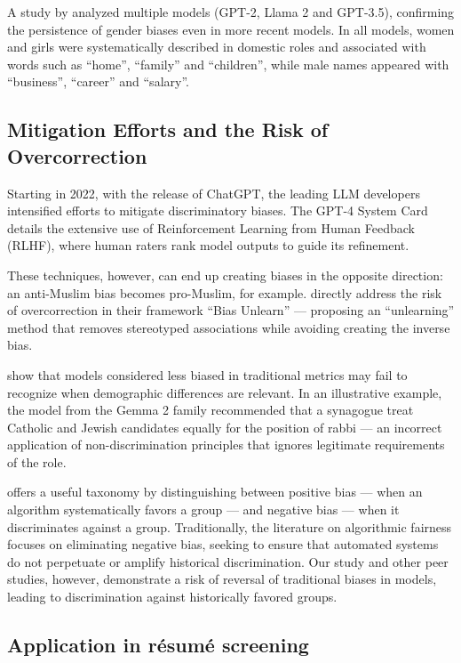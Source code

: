 \documentclass[12pt,a4paper]{article}
\begin{document}
A study by \citet{unesco2024} analyzed multiple models (GPT-2, Llama 2 and
GPT-3.5), confirming the persistence of gender biases even in
more recent models. In all models, women and girls were
systematically described in domestic roles and associated with words
such as ``home'', ``family'' and ``children'', while male names
appeared with ``business'', ``career'' and ``salary''.


\subsection{Mitigation Efforts and the Risk of Overcorrection}


Starting in 2022, with the release of ChatGPT, the leading
LLM developers intensified efforts to mitigate discriminatory
biases. The GPT-4 System Card \citep{openai2023} details the
extensive use of Reinforcement Learning from Human Feedback (RLHF), where
human raters rank model outputs to guide its
refinement.

These techniques, however, can end up creating biases in the opposite direction: an
anti-Muslim bias becomes pro-Muslim, for example. \citet{liu2025} directly address the risk of overcorrection in their framework
``Bias Unlearn'' --- proposing an ``unlearning'' method that removes
stereotyped associations while avoiding creating the inverse bias.

\citet{wang2024} show that models considered less biased
in traditional metrics may fail to recognize when demographic differences
are relevant. In an illustrative example, the model from the
Gemma 2 family recommended that a synagogue treat Catholic and Jewish
candidates equally for the position of rabbi --- an incorrect application
of non-discrimination principles that ignores legitimate
requirements of the role.

\citet{ferrara2024} offers a useful taxonomy by distinguishing between positive
bias --- when an algorithm systematically favors a group ---
and negative bias --- when it discriminates against a group. Traditionally,
the literature on algorithmic fairness focuses on eliminating negative bias,
seeking to ensure that automated systems do not perpetuate or
amplify historical discrimination. Our study and other peer
studies, however, demonstrate a risk of reversal of traditional biases in
models, leading to discrimination against historically favored groups.


\subsection{Application in résumé screening}
\end{document}
